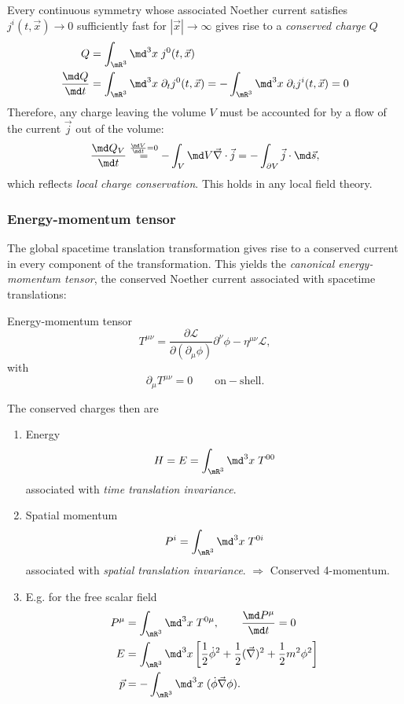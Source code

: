 Every continuous symmetry whose associated Noether current satisfies $j^i(t,\vec{x}) \rightarrow0$ sufficiently fast for $|\vec{x}|\rightarrow\infty$ gives rise to a \emph{conserved charge} $Q$ 
\begin{align}
	Q&=\int_{\mR^3} \md^3 x \; j^0 (t,\vec{x})\\
	\frac{\md Q}{\md t} &= \int_{\mR^3} \md^3x \;  \partial_t j^0(t,\vec{x}) = -\int_{\mR^3} \md^3x \; \partial_i j^i(t,\vec{x}) = 0 
\end{align}
Therefore, any charge leaving the volume $V$ must be accounted for by a flow of the current $\vec{j}$ out of the volume:
	\begin{equation}
		\frac{\md Q_V}{\md t} \stackrel{\frac{\md V}{\md t}=0}{=} -\int_V \md V \vec{\nabla}\cdot \vec{j} = - \int_{\partial V} \vec{j}\cdot \md \vec{s},
	\end{equation}
	which reflects \emph{local charge conservation}. This holds in any local field theory.

\subsubsection{Energy-momentum tensor}
The global spacetime translation transformation gives rise to a conserved current in every component of the transformation. This yields the \emph{canonical energy-momentum tensor}, the conserved Noether current associated with spacetime translations:
\begin{mybox}{Energy-momentum tensor}
 \begin{equation}
 	T^{\mu \nu} = \frac{\partial \mathcal{L}}{\partial (\partial_{\mu} \phi)} \partial^{\nu} \phi - \eta^{\mu \nu} \mathcal{L},
 \end{equation}
 with
 \begin{equation}
 	\partial_{\mu} T^{\mu \nu} = 0 \qquad \mathrm{on-shell}.
 \end{equation}
\end{mybox}
The conserved charges then are 
\begin{enumerate}
	\item Energy 
	\begin{equation}
		H=E= \int_{\mR^3} \md^3x \; T^{00}
	\end{equation}
	associated with \emph{time translation invariance}.
	\item Spatial momentum 
	\begin{equation}
		P^i = \int_{\mR^3} \md^3x \; T^{0i}
	\end{equation}
	associated with \emph{spatial translation invariance}. $\Rightarrow$ Conserved 4-momentum.
	\item E.g. for the free scalar field 
	\begin{align}
	 P^{\mu} &= \int_{\mR^3} \md^3 x \; T^{0 \mu}, \qquad \frac{\md P^{\mu}}{\md t}=0 \\
	 E&= \int_{\mR^3} \md^3x \left[\frac{1}{2} \dot{\phi}^2 + \frac{1}{2}(\vec{\nabla})^2 +\frac{1}{2} m^2 \phi^2\right]\\
	 \vec{p}&= - \int_{\mR^3} \md^3 x \; (\dot{\phi} \vec{\nabla} \phi).
	\end{align}
\end{enumerate}
